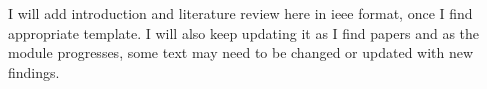 I will add introduction and literature review here in ieee format, once I find appropriate template. I will also keep updating it as I find papers and as the module progresses, some text may need to be changed or updated with new findings.